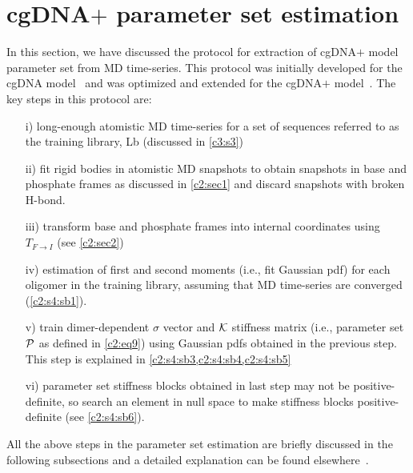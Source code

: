 \section{cgDNA$+$ parameter set estimation}\label{c2:sec4}
In this section, we have discussed the protocol for extraction of cgDNA$+$ model parameter set from MD time-series. 
This protocol was initially developed for the cgDNA model~\cite{petkevivciute2014cgdna} and was optimized and extended for the cgDNA$+$ model~\cite{patelithesis}. 
The key steps in this protocol are:
\begin{itemize} \label{c2:list2}
\setlength\itemsep{0em}
    \item[i)] long-enough atomistic MD time-series for a set of sequences referred to as the training library, Lb (discussed in \cref{c3:s3})
    \item [ii)] fit rigid bodies in atomistic MD snapshots to obtain snapshots in base and phosphate frames as discussed in \cref{c2:sec1} and discard snapshots with broken H-bond.
    \item [iii)] transform base and phosphate frames into internal coordinates using $T_{F\xrightarrow{}I}$ (see \cref{c2:sec2})
    \item [iv)] estimation of first and second moments (i.e., fit Gaussian pdf) for each oligomer in the training library, assuming that MD time-series are converged (\cref{c2:s4:sb1}).
    \item [v)] train dimer-dependent $\sigma$ vector and ${\mathcal K}$ stiffness matrix (i.e., parameter set ${\mathcal P}$ as defined in \cref{c2:eq9}) using Gaussian pdfs obtained in the previous step. This step is explained in \cref{c2:s4:sb3,c2:s4:sb4,c2:s4:sb5}
    \item [vi)] parameter set stiffness blocks obtained in last step may not be positive-definite, so search an element in null space to make stiffness blocks positive-definite (see \cref{c2:s4:sb6}).
\end{itemize}
All the above steps in the parameter set estimation are briefly discussed in the following subsections and a detailed explanation can be found elsewhere~\cite{patelithesis}. 
